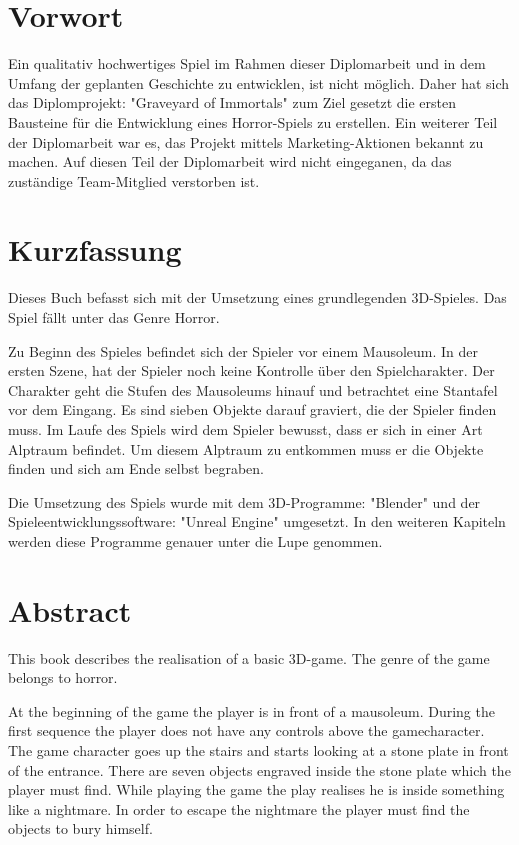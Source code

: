 \usepackage{natbib}

\section{Vorwort}

Ein qualitativ hochwertiges Spiel im Rahmen dieser Diplomarbeit und in dem Umfang der geplanten Geschichte
zu entwicklen, ist nicht möglich.
Daher hat sich das Diplomprojekt: "Graveyard of Immortals" zum Ziel gesetzt die ersten Bausteine für die Entwicklung
eines Horror-Spiels zu erstellen.
Ein weiterer Teil der Diplomarbeit war es, das Projekt mittels Marketing-Aktionen bekannt zu machen.
Auf diesen Teil der Diplomarbeit wird nicht eingeganen, da das zuständige Team-Mitglied verstorben ist.

\section{Kurzfassung}

Dieses Buch befasst sich mit der Umsetzung eines grundlegenden 3D-Spieles.
Das Spiel fällt unter das Genre Horror.

Zu Beginn des Spieles befindet sich der Spieler vor einem Mausoleum.
In der ersten Szene, hat der Spieler noch keine Kontrolle über den Spielcharakter.
Der Charakter geht die Stufen des Mausoleums hinauf und betrachtet eine Stantafel vor dem Eingang.
Es sind sieben Objekte darauf graviert, die der Spieler finden muss.
Im Laufe des Spiels wird dem Spieler bewusst, dass er sich in einer Art Alptraum befindet.
Um diesem Alptraum zu entkommen muss er die Objekte finden und sich am Ende selbst begraben.

Die Umsetzung des Spiels wurde mit dem 3D-Programme: "Blender" und der Spieleentwicklungssoftware: "Unreal Engine" umgesetzt.
In den weiteren Kapiteln werden diese Programme genauer unter die Lupe genommen.

\section{Abstract}
This book describes the realisation of a basic 3D-game.
The genre of the game belongs to horror.

At the beginning of the game the player is in front of a mausoleum.
During the first sequence the player does not have any controls above the gamecharacter.
The game character goes up the stairs and starts looking at a stone plate  in front of the entrance.
There are seven objects engraved inside the stone plate which the player must find.
While playing the game the play realises he is inside something like a nightmare.
In order to escape the nightmare the player must find the objects to bury himself.

